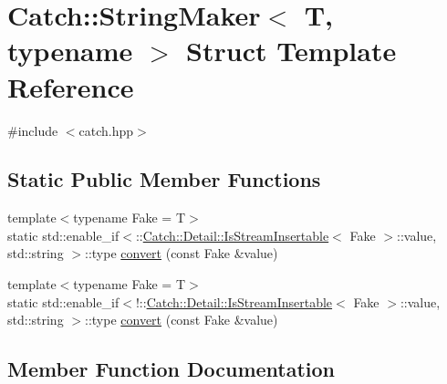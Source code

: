 \hypertarget{struct_catch_1_1_string_maker}{}\section{Catch\+::String\+Maker$<$ T, typename $>$ Struct Template Reference}
\label{struct_catch_1_1_string_maker}


{\ttfamily \#include $<$catch.\+hpp$>$}

\subsection*{Static Public Member Functions}
\begin{DoxyCompactItemize}
\item 
{\footnotesize template$<$typename Fake  = T$>$ }\\static std\+::enable\+\_\+if$<$\+::\mbox{\hyperlink{class_catch_1_1_detail_1_1_is_stream_insertable}{Catch\+::\+Detail\+::\+Is\+Stream\+Insertable}}$<$ Fake $>$\+::value, std\+::string $>$\+::type \mbox{\hyperlink{struct_catch_1_1_string_maker_ab2c357e22b754802c4b1351257103eb6}{convert}} (const Fake \&value)
\item 
{\footnotesize template$<$typename Fake  = T$>$ }\\static std\+::enable\+\_\+if$<$!\+::\mbox{\hyperlink{class_catch_1_1_detail_1_1_is_stream_insertable}{Catch\+::\+Detail\+::\+Is\+Stream\+Insertable}}$<$ Fake $>$\+::value, std\+::string $>$\+::type \mbox{\hyperlink{struct_catch_1_1_string_maker_a68bb548de0e5ad364228b1ca3dd2f561}{convert}} (const Fake \&value)
\end{DoxyCompactItemize}


\subsection{Member Function Documentation}
\mbox{\label{struct_catch_1_1_string_maker_ab2c357e22b754802c4b1351257103eb6}} 
